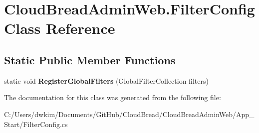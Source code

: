 \hypertarget{class_cloud_bread_admin_web_1_1_filter_config}{}\section{Cloud\+Bread\+Admin\+Web.\+Filter\+Config Class Reference}
\label{class_cloud_bread_admin_web_1_1_filter_config}
\subsection*{Static Public Member Functions}
\begin{DoxyCompactItemize}
\item 
static void {\bfseries Register\+Global\+Filters} (Global\+Filter\+Collection filters)\hypertarget{class_cloud_bread_admin_web_1_1_filter_config_a9db9bd1f7026c29c5e41847e671ebf9c}{}\label{class_cloud_bread_admin_web_1_1_filter_config_a9db9bd1f7026c29c5e41847e671ebf9c}

\end{DoxyCompactItemize}


The documentation for this class was generated from the following file\+:\begin{DoxyCompactItemize}
\item 
C\+:/\+Users/dwkim/\+Documents/\+Git\+Hub/\+Cloud\+Bread/\+Cloud\+Bread\+Admin\+Web/\+App\+\_\+\+Start/Filter\+Config.\+cs\end{DoxyCompactItemize}
